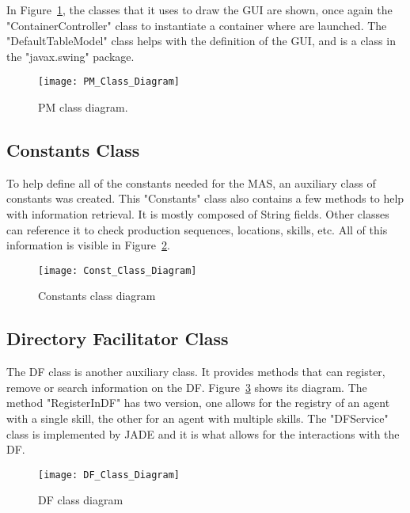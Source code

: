 In Figure~\ref{fig:pm_class_diagram}, the classes that it uses to draw the \acrshort{GUI} are shown, once again the "ContainerController" class to instantiate a container where  are launched. The "DefaultTableModel" class helps with the definition of the \acrshort{GUI}, and is a class in the "javax.swing" package.\\

\begin{figure}[h!]
	\centering
	\texttt{[image: PM\_Class\_Diagram]}
	\caption{\acrlong{PM} class diagram.}
	\label{fig:pm_class_diagram}
\end{figure}


\subsection{Constants Class}
\label{subsec:constants}

To help define all of the constants needed for the \acrshort{MAS}, an auxiliary class of constants was created. This "Constants" class also contains a few methods to help with information retrieval. It is mostly composed of String fields. Other classes can reference it to check production sequences, locations, skills, etc. All of this information is visible in Figure~\ref{fig:const_class_diagram}.

\begin{figure}[h!]
	\centering
	\texttt{[image: Const\_Class\_Diagram]}
	\caption{Constants class diagram}
	\label{fig:const_class_diagram}
\end{figure}

\subsection{Directory Facilitator Class}
\label{subsec:directory_facilitator}

The \acrlong{DF} class is another auxiliary class. It provides methods that can register, remove or search information on the \acrshort{DF}. Figure~\ref{fig:df_class_diagram} shows its diagram. The method "RegisterInDF" has two version, one allows for the registry of an agent with a single skill, the other for an agent with multiple skills. The "DFService" class is implemented by \acrshort{JADE} and it is what allows for the interactions with the \acrshort{DF}.\\

\begin{figure}[h!]
	\centering
	\texttt{[image: DF\_Class\_Diagram]}
	\caption{\acrlong{DF} class diagram}
	\label{fig:df_class_diagram}
\end{figure}

